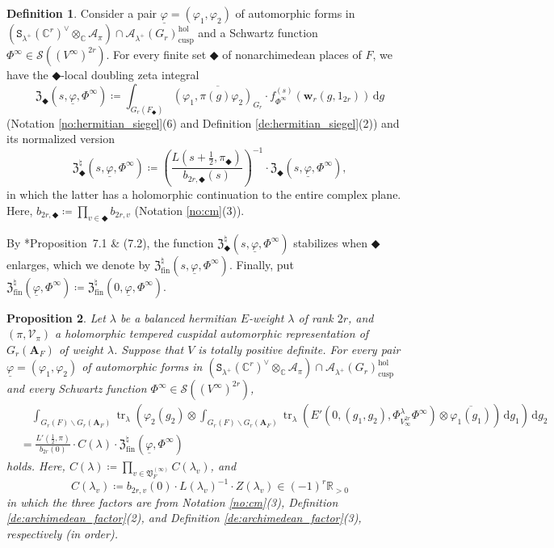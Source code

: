 \documentclass[12pt]{amsart}
\numberwithin{equation}{section}
\theoremstyle{plain}
\newtheorem{proposition}{Proposition}[section]
\theoremstyle{definition}
\newtheorem{definition}[proposition]{Definition}
\theoremstyle{remark}
\renewcommand{\b}[1]{\mathbf{#1}}
\renewcommand{\c}[1]{\mathcal{#1}}
\renewcommand{\d}[1]{\mathbb{#1}}
\newcommand{\f}[1]{\mathfrak{#1}}
\renewcommand{\r}[1]{\mathrm{#1}}
\newcommand{\s}[1]{\mathscr{#1}}
\renewcommand{\(}{\left(}
\renewcommand{\)}{\right)}
\newcommand{\ol}[1]{\overline{#1}{}}
\newcommand{\ul}{\underline}
\newcommand{\bA}{\b A}
\newcommand{\bw}{\b w}
\newcommand{\cA}{\c A}
\newcommand{\cV}{\c V}
\newcommand{\dC}{\d C}
\newcommand{\dR}{\d R}
\newcommand{\fV}{\f V}
\newcommand{\fZ}{\f Z}
\newcommand{\rd}{\,\r d}
\newcommand{\sS}{\s S}
\newcommand{\tS}{\mathtt{S}}
\newcommand{\cusp}{\r{cusp}}
\newcommand{\fin}{\r{fin}}
\newcommand{\hol}{\r{hol}}
\DeclareMathOperator{\tr}{tr}
\begin{document}
\begin{definition}\label{de:doubling_zeta}
Consider a pair $\ul\varphi=(\varphi_1,\varphi_2)$ of automorphic forms in $\(\tS_{\lambda^+}(\dC^r)^\vee\otimes_\dC\cA_\pi\)\cap\cA_{\lambda^+}(G_r)_\cusp^\hol$ and a Schwartz function $\Phi^\infty\in\sS((V^\infty)^{2r})$. For every finite set $\Diamondblack$ of nonarchimedean places of $F$, we have the $\Diamondblack$-local doubling zeta integral
\[
\fZ_\Diamondblack(s,\ul\varphi,\Phi^\infty)\coloneqq\int_{G_r(F_\Diamondblack)}
\ol{(\varphi_1,\pi(g)\varphi_2)_{G_r}}\cdot f_{\Phi^\infty}^{(s)}(\bw_r(g,1_{2r}))\rd g
\]
(Notation \ref{no:hermitian_siegel}(6) and Definition \ref{de:hermitian_siegel}(2)) and its normalized version
\[
\fZ^\natural_\Diamondblack(s,\ul\varphi,\Phi^\infty)\coloneqq
\(\frac{L(s+\tfrac{1}{2},\pi_\Diamondblack)}{b_{2r,\Diamondblack}(s)}\)^{-1}\cdot\fZ_\Diamondblack(s,\ul\varphi,\Phi^\infty),
\]
in which the latter has a holomorphic continuation to the entire complex plane. Here, $b_{2r,\Diamondblack}\coloneqq\prod_{v\in\Diamondblack}b_{2r,v}$ (Notation \ref{no:cm}(3)).

By \cite{Yam14}*{Proposition~7.1 \& (7.2)}, the function $\fZ^\natural_\Diamondblack(s,\ul\varphi,\Phi^\infty)$ stabilizes when $\Diamondblack$ enlarges, which we denote by $\fZ^\natural_\fin(s,\ul\varphi,\Phi^\infty)$. Finally, put $\fZ^\natural_\fin(\ul\varphi,\Phi^\infty)\coloneqq\fZ^\natural_\fin(0,\ul\varphi,\Phi^\infty)$.
\end{definition}




\begin{proposition}\label{pr:ripf}
Let $\lambda$ be a balanced hermitian $E$-weight $\lambda$ of rank $2r$, and $(\pi,\cV_\pi)$ a holomorphic tempered cuspidal automorphic representation of $G_r(\bA_F)$ of weight $\lambda$. Suppose that $V$ is totally positive definite. For every pair $\ul\varphi=(\varphi_1,\varphi_2)$ of automorphic forms in $\(\tS_{\lambda^+}(\dC^r)^\vee\otimes_\dC\cA_\pi\)\cap\cA_{\lambda^+}(G_r)_\cusp^\hol$ and every Schwartz function $\Phi^\infty\in\sS((V^\infty)^{2r})$,
\begin{align*}
&\quad\int_{G_r(F)\backslash G_r(\bA_F)}\tr_\lambda\(\varphi_2(g_2)\otimes
\int_{G_r(F)\backslash G_r(\bA_F)}
\tr_\lambda\(E'(0,(g_1,g_2),\Phi^\lambda_{V_\infty^{2r}}\Phi^\infty)\otimes\ol{\varphi_1(g_1)}\)\rd g_1\)\rd g_2 \\
&=\frac{L'(\tfrac{1}{2},\pi)}{b_{2r}(0)}\cdot C(\lambda)
\cdot\fZ^\natural_\fin(\ul{\varphi},\Phi^\infty)
\end{align*}
holds. Here, $C(\lambda)\coloneqq\prod_{v\in\fV_F^{(\infty)}}C(\lambda_v)$, and
\[
C(\lambda_v)\coloneqq b_{2r,v}(0)\cdot L(\lambda_v)^{-1}\cdot Z(\lambda_v)\in (-1)^r\dR_{>0}
\]
in which the three factors are from Notation \ref{no:cm}(3), Definition \ref{de:archimedean_factor}(2), and Definition \ref{de:archimedean_factor}(3), respectively (in order).
\end{proposition}
\end{document}
